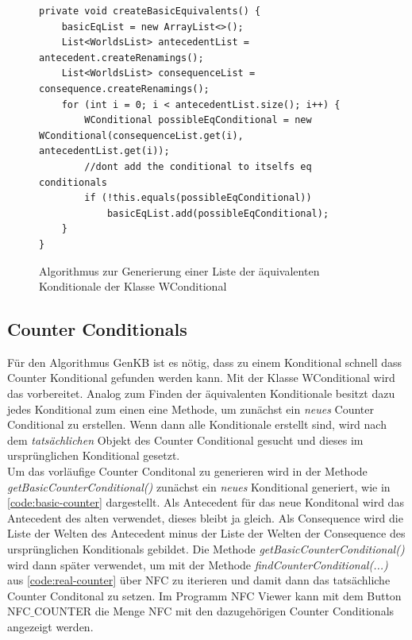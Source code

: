 \documentclass[12pt,a4paper]{article}
\begin{document}
\begin{figure}
\begin{lstlisting}
private void createBasicEquivalents() {
    basicEqList = new ArrayList<>();
    List<WorldsList> antecedentList = antecedent.createRenamings();
    List<WorldsList> consequenceList = consequence.createRenamings();
    for (int i = 0; i < antecedentList.size(); i++) {
        WConditional possibleEqConditional = new WConditional(consequenceList.get(i), antecedentList.get(i));
        //dont add the conditional to itselfs eq conditionals
        if (!this.equals(possibleEqConditional))
            basicEqList.add(possibleEqConditional);
    }
}
\end{lstlisting}
\caption{Algorithmus zur Generierung einer Liste der äquivalenten Konditionale der Klasse WConditional}
\label{code:create-equivalents}
\end{figure} 




\subsection{Counter Conditionals}
\label{sec:counter-conditonals}
Für den Algorithmus GenKB ist es nötig, dass zu einem Konditional schnell dass Counter Konditional gefunden werden kann. Mit der Klasse WConditional wird das vorbereitet. Analog zum Finden der äquivalenten Konditionale besitzt dazu jedes Konditional zum einen eine Methode, um zunächst ein \textit{neues} Counter Conditional zu erstellen. Wenn dann alle Konditionale erstellt sind, wird nach dem \textit{tatsächlichen} Objekt des Counter Conditional gesucht und dieses im ursprünglichen Konditional gesetzt. \\
Um das vorläufige Counter Conditonal zu generieren wird in der Methode \textit{getBasicCounterConditional()} zunächst ein \textit{neues} Konditional generiert, wie in \autoref{code:basic-counter} dargestellt. Als Antecedent für das neue Konditonal wird das Antecedent des alten verwendet, dieses bleibt ja gleich. Als Consequence wird die Liste der Welten des Antecedent minus der Liste der Welten der Consequence  des ursprünglichen Konditionals gebildet. Die Methode \textit{getBasicCounterConditional()} wird dann später verwendet, um mit der Methode \textit{findCounterConditional(...)} aus \autoref{code:real-counter} über NFC zu iterieren und damit dann das tatsächliche Counter Conditonal zu setzen. Im Programm NFC Viewer kann mit dem Button NFC$\_$COUNTER die Menge NFC mit den dazugehörigen Counter Conditionals angezeigt werden.
\end{document}
